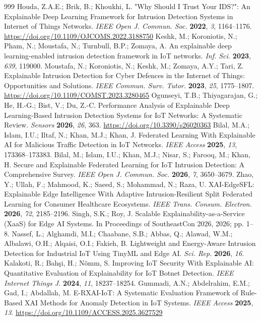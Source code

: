 \begin{thebibliography}{999}
Houda, Z.A.E.; Brik, B.; Khoukhi, L. "Why Should I Trust Your IDS?": An Explainable Deep Learning Framework for Intrusion Detection Systems in Internet of Things Networks. \textit{IEEE Open J. Commun. Soc.} \textbf{2022}, \textit{3}, 1164--1176. \url{https://doi.org/10.1109/OJCOMS.2022.3188750}
Keshk, M.; Koroniotis, N.; Pham, N.; Moustafa, N.; Turnbull, B.P.; Zomaya, A. An explainable deep learning-enabled intrusion detection framework in IoT networks. \textit{Inf. Sci.} \textbf{2023}, \textit{639}, 119000.
Moustafa, N.; Koroniotis, N.; Keshk, M.; Zomaya, A.Y.; Tari, Z. Explainable Intrusion Detection for Cyber Defences in the Internet of Things: Opportunities and Solutions. \textit{IEEE Commun. Surv. Tutor.} \textbf{2023}, \textit{25}, 1775--1807. \url{https://doi.org/10.1109/COMST.2023.3280465}
Ogunseyi, T.B.; Thiyagarajan, G.; He, H.-G.; Bist, V.; Du, Z.-C. Performance Analysis of Explainable Deep Learning-Based Intrusion Detection Systems for IoT Networks: A Systematic Review. \textit{Sensors} \textbf{2026}, \textit{26}, 363. \url{https://doi.org/10.3390/s26020363}
Bilal, M.A.; Islam, I.U.; Iltaf, N.; Khan, M.J.; Khan, J. Federated Learning With Explainable AI for Malicious Traffic Detection in IoT Networks. \textit{IEEE Access} \textbf{2025}, \textit{13}, 173368--173383.
Bilal, M.; Islam, I.U.; Khan, M.J.; Nisar, S.; Farooq, M.; Khan, H. Secure and Explainable Federated Learning for IoT Intrusion Detection: A Comprehensive Survey. \textit{IEEE Open J. Commun. Soc.} \textbf{2026}, \textit{7}, 3650--3679.
Zhao, Y.; Ullah, F.; Mahmood, K.; Saeed, S.; Mohammad, N.; Raza, U. XAI-EdgeSFL: Explainable Edge Intelligence With Adaptive Intrusion-Resilient Split Federated Learning for Consumer Healthcare Ecosystems. \textit{IEEE Trans. Consum. Electron.} \textbf{2026}, \textit{72}, 2185--2196.
Singh, S.K.; Roy, J. Scalable Explainability-as-a-Service (XaaS) for Edge AI Systems. In Proceedings of SoutheastCon 2026, 2026; pp. 1--8.
Nassef, L.; Alghamdi, M.I.; Chaabane, S.B.; Abbas, Q.; Alawad, W.M.; Albalawi, O.H.; Alqaisi, O.I.; Fakieh, B. Lightweight and Energy-Aware Intrusion Detection for Industrial IoT Using TinyML and Edge AI. \textit{Sci. Rep.} \textbf{2026}, \textit{16}.
Kalakoti, R.; Bahşi, H.; Nõmm, S. Improving IoT Security With Explainable AI: Quantitative Evaluation of Explainability for IoT Botnet Detection. \textit{IEEE Internet Things J.} \textbf{2024}, \textit{11}, 18237--18254.
Gummadi, A.N.; Abdelrahim, E.M.; Gad, I.; Abdallah, M. E-RXAI-IoT: A Systematic Evaluation Framework of Rule-Based XAI Methods for Anomaly Detection in IoT Systems. \textit{IEEE Access} \textbf{2025}, \textit{13}. \url{https://doi.org/10.1109/ACCESS.2025.3627529}

\end{thebibliography}
